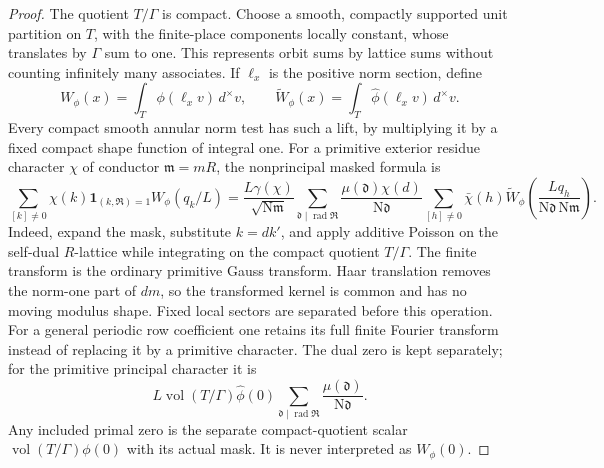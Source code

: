 \documentclass[11pt,a4paper]{article}
\theoremstyle{remark}\newtheorem{remark}[theorem]{Remark}
\newcommand{\N}{\mathrm N}
\newcommand{\one}{\mathbf 1}
\numberwithin{equation}{section}
\begin{document}
\begin{proof}
The quotient $T/\Gamma$ is compact. Choose a smooth, compactly
supported unit partition on $T$, with the finite-place components
locally constant, whose translates by $\Gamma$ sum to one.
This represents orbit sums by lattice sums without counting infinitely
many associates. If $\ell_x$ is the positive norm section, define
\[
 W_\phi(x)=\int_T\phi(\ell_xv)\,d^\times v,
 \qquad \widetilde W_\phi(x)
       =\int_T\widehat\phi(\ell_xv)\,d^\times v.
\]
Every compact smooth annular norm test has such a lift, by multiplying
it by a fixed compact shape function of integral one. For a primitive
exterior residue character $\chi$ of conductor $\mathfrak m=mR$,
the nonprincipal masked formula is
\[
 \sum_{[k]\ne0}\chi(k)\one_{(k,\mathfrak R)=1}W_\phi(q_k/L)
 =\frac{L\gamma(\chi)}{\sqrt{\N\mathfrak m}}
  \sum_{\mathfrak d\mid\operatorname{rad}\mathfrak R}
       \frac{\mu(\mathfrak d)\chi(d)}{\N\mathfrak d}
  \sum_{[h]\ne0}\bar\chi(h)
       \widetilde W_\phi\!\left(
         \frac{Lq_h}{\N\mathfrak d\,\N\mathfrak m}\right).
\]
Indeed, expand the mask, substitute $k=dk'$, and apply additive
Poisson on the self-dual $R$-lattice while integrating on the compact
quotient $T/\Gamma$. The finite transform is the ordinary primitive
Gauss transform. Haar translation removes the norm-one part of $dm$,
so the transformed kernel is common and has no moving modulus shape.
Fixed local sectors are separated before this operation. For a general
periodic row coefficient one retains its full finite Fourier transform
instead of replacing it by a primitive character. The dual zero is
kept separately; for the primitive principal character it is
\[
 L\operatorname{vol}(T/\Gamma)\widehat\phi(0)
       \sum_{\mathfrak d\mid\operatorname{rad}\mathfrak R}
                         \frac{\mu(\mathfrak d)}{\N\mathfrak d}.
\]
Any included primal zero is the separate compact-quotient scalar
$\operatorname{vol}(T/\Gamma)\phi(0)$ with its actual mask.
It is never interpreted as $W_\phi(0)$.


\end{proof}
\end{document}
